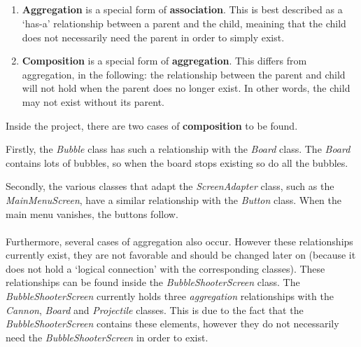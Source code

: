 \documentclass[a4paper,11pt]{article}
\begin{document}
\subsection{}
\begin{enumerate}
  \item \textbf{Aggregation} is a special form of \textbf{association}. This is best described as a `has-a' relationship between a parent and the child, meaining that the child does not necessarily need the parent in order to simply exist.
  \item \textbf{Composition} is a special form of \textbf{aggregation}. This differs from aggregation, in the following: the relationship between the parent and child will not hold when the parent does no longer exist. In other words, the child may not exist without its parent.
\end{enumerate}
Inside the project, there are two cases of \textbf{composition} to be found.
\par Firstly, the \textit{Bubble} class has such a relationship with the \textit{Board} class. The \textit{Board} contains lots of bubbles, so when the board stops existing so do all the bubbles.
\par Secondly, the various classes that adapt the \textit{ScreenAdapter} class, such as the \textit{MainMenuScreen}, have a similar relationship with the \textit{Button} class. When the main menu vanishes, the buttons follow. \\\\
Furthermore, several cases of aggregation also occur. However these relationships currently exist, they are not favorable and should be changed later on (because it does not hold a `logical connection' with the corresponding classes). These relationships can be found inside the \textit{BubbleShooterScreen} class. The \textit{BubbleShooterScreen} currently holds three \textit{aggregation} relationships with the \textit{Cannon}, \textit{Board} and \textit{Projectile} classes. This is due to the fact that the \textit{BubbleShooterScreen} contains these elements, however they do not necessarily need the \textit{BubbleShooterScreen} in order to exist.


\end{document}
